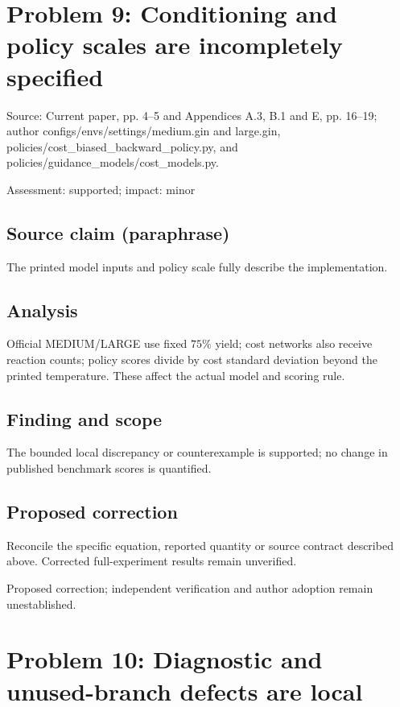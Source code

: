 \documentclass[11pt]{article}
\begin{document}
\section*{Problem 9: Conditioning and policy scales are incompletely specified}

Source: Current paper, pp. 4–5 and Appendices A.3, B.1 and E, pp. 16–19; author configs/envs/settings/medium.gin and large.gin, policies/cost\_biased\_backward\_policy.py, and policies/guidance\_models/cost\_models.py.

Assessment: supported; impact: minor

\subsection*{Source claim (paraphrase)}

The printed model inputs and policy scale fully describe the implementation.

\subsection*{Analysis}

Official MEDIUM/LARGE use fixed \(75\%\) yield; cost networks also receive reaction counts; policy scores divide by cost standard deviation beyond the printed temperature. These affect the actual model and scoring rule.

\subsection*{Finding and scope}

The bounded local discrepancy or counterexample is supported; no change in published benchmark scores is quantified.

\subsection*{Proposed correction}

Reconcile the specific equation, reported quantity or source contract described above. Corrected full-experiment results remain unverified.

Proposed correction; independent verification and author adoption remain unestablished.

\section*{Problem 10: Diagnostic and unused-branch defects are local}
\end{document}

